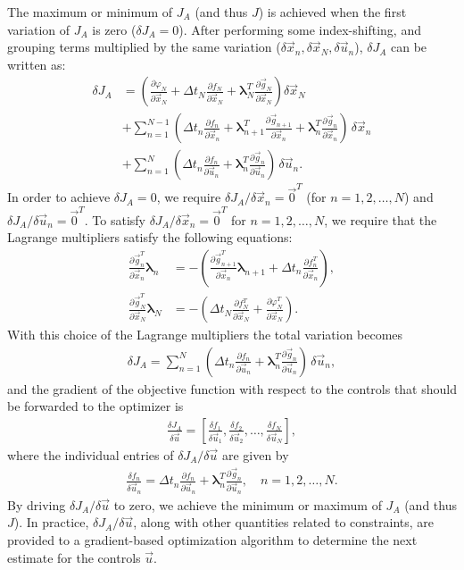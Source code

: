\documentclass[twocolumn,numbook]{svjour3}          %
\newcommand{\fsum}[3]{\sum_{#1}^{#2}{#3}}
\newcommand{\pder}[2]{\frac{\partial #1}{\partial #2}}
\def\u{{\vec u}}
\def\x{{\vec x}}
\def\p{{\vec{g}}}
\def\0{{\vec 0}}
\def\blambda{{\pmb{\lambda}}}%
\def\M{{\varphi}}
\def\F{f}
\def\myobj{J}
\begin{document}
The maximum or minimum of $\myobj_A$ (and thus $\myobj$) is achieved when the first variation of $\myobj_A$ is 
zero ($\delta \myobj_A=0$). After performing some index-shifting, and grouping
terms multiplied by the same variation ($\delta \x_n, \delta \x_N,
\delta \u_n$), $\delta \myobj_A$ can be written as:
%
\begin{align}
\label{eq:discreteAfterRegrouping}
  \delta \myobj_A &=
  \left (
    \pder{\M_N}{\x_N}
    + \Delta t_N \pder{\F_N}{\x_N}
    + \blambda_N^T\pder{\p_N}{\x_N}
    \right ) \delta \x_N
    \nonumber \\
    &+\fsum{n=1}{N-1}{
      \left (
        \Delta t_n \pder{ \F_n}{\x_n}
        +\blambda^T_{n+1}\pder{\p_{n+1}}{\x_n}
        +\blambda^T_n\pder{\p_n}{\x_n}
      \right ) \, \delta \x_n
    } \nonumber \\
    &+\fsum{n=1}{N}{
      \left (
        \Delta t_n \pder{\F_n}{\u_n}
        +\blambda^T_n\pder{\p_n}{\u_n}
      \right ) \, \delta \u_n.
    }
\end{align}
%
In order to achieve $\delta \myobj_A=0$, we require $\delta \myobj_A / \delta \x_n=\0^T$ (for $n=1,2, \ldots, N$) and $\delta \myobj_A / \delta \u_n=\0^T$. To satisfy $\delta \myobj_A / \delta \x_n =\0^T$ for $n=1,2, \ldots, N$, we require that the Lagrange multipliers satisfy the following equations:
%
\begin{align}
\label{eq:discreteODE}
 \pder{\p_n^T}{\x_n}  \blambda_n &= -
 \left (\pder{\p_{n+1}^T}{\x_n} \blambda_{n+1} + \Delta t_n \pder{\F^T_n}{\x_n}
 \right ),%
\\
\label{eq:discreteBC}
  \pder{\p_N^T}{\x_N} \blambda_N &= -
  \left ( \Delta t_N \pder{\F^T_N}{\x_N} + \pder{\M_N^T}{\x_N} \right ).
\end{align}
%
With this choice of the Lagrange multipliers the total variation becomes
\begin{align*}
  \delta \myobj_A =
    \fsum{n=1}{N}{
      \left (
        \Delta t_n \pder{\F_n}{\u_n}
      +\blambda^T_n\pder{\p_n}{\u_n}
      \right ) \, \delta \u_n ,
    }
\end{align*}
and the gradient of the objective function with respect to the controls that
should be forwarded to the optimizer is
\begin{align}
\label{eq:optimizerDiscreteGradient}
  \frac{\delta \myobj_A}{\delta \u} = \left [
  \frac{\delta f_1}{\delta \u_1}, \frac{\delta f_2}{\delta \u_2},
  \ldots,
  \frac{\delta f_N}{\delta \u_N} \right ], 
\end{align}
where the individual entries of $\delta \myobj_A/\delta \u$ are given by
\begin{align}
\label{eq:discreteGradient}
  \frac{\delta f_n}{\delta \u_n} =
  \Delta t_n  \pder{\F_n}{\u_n}
  +\blambda^T_n\pder{\p_n}{\u_n}, \quad n=1,2,\ldots,N.
\end{align}
%
By driving $\delta \myobj_A / \delta \u$ to zero, we achieve the minimum or 
maximum of $\myobj_A$ (and thus $\myobj$). In practice, $\delta \myobj_A / \delta \u$, 
along with other quantities related to constraints, are provided to a 
gradient-based optimization algorithm to determine the next estimate for the controls $\u$.
\end{document}
